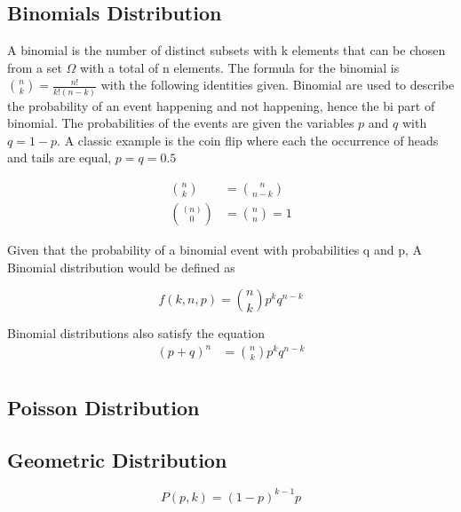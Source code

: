 \documentclass[11pt,a4paper]{book}
\begin{document}
		\subsection{Binomials Distribution}
			\label{subsec:Binomials Distribution}
			A binomial is the number of distinct subsets with k elements that can be chosen from a set $\Omega$ with a total of n elements. The formula for the binomial is $\binom{n}{k} = \frac{n!}{k! \left(n - k\right)}$ with the following identities given. Binomial are used to describe the probability of an event happening and not happening, hence the bi part of binomial. The probabilities of the events are given the variables $p$ and $q$ with $q=1-p$. A classic example is the coin flip where each the occurrence of heads and tails are equal, $p=q=0.5$
			
			\begin{equation}
			\label{eq:binomial properties}
			\begin{split}
			\binom{n}{k} &= \binom{n}{n-k} \\
			\binom{(n)}{0} &= \binom{n}{n} = 1
			\end{split}
			\end{equation}
			
			\noindent Given that the probability of a binomial event with probabilities q and p, A Binomial distribution would be defined as 
			
			\begin{equation}
			\label{eq:binomial distribution}
			f(k,n,p)=\binom{n}{k}p^k q^{n-k}
			\end{equation}
			
			\noindent Binomial distributions also satisfy the equation 
			\begin{equation}
			\label{eq:binomial expansion}
			\begin{split}
			(p+q)^n &= \binom{n}{k}p^k q^{n-k} \\
			\end{split}
			\end{equation}
			
			\subsection{Poisson Distribution}	
			\label{subsec:Poisson Distribution}
	
			\subsection{Geometric Distribution}	
			\label{subsec:Geometric Distribution}
			\begin{equation}
			P(p,k)=(1-p)^{k-1}p
			\end{equation}
			
\end{document}
